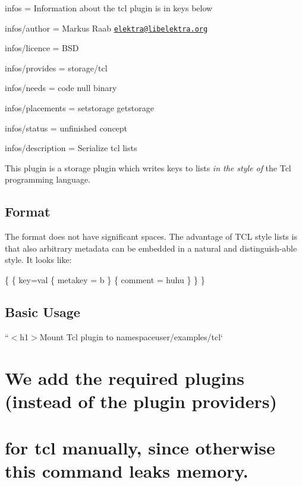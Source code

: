 
\begin{DoxyItemize}
\item infos = Information about the tcl plugin is in keys below
\item infos/author = Markus Raab \href{mailto:elektra@libelektra.org}{\tt elektra@libelektra.\+org}
\item infos/licence = B\+SD
\item infos/provides = storage/tcl
\item infos/needs = code null binary
\item infos/placements = setstorage getstorage
\item infos/status = unfinished concept
\item infos/description = Serialize tcl lists
\end{DoxyItemize}

This plugin is a storage plugin which writes keys to lists {\itshape in the style of} the Tcl programming language.

\subsection*{Format}

The format does not have significant spaces. The advantage of T\+CL style lists is that also arbitrary metadata can be embedded in a natural and distinguish-\/able style. It looks like\+:


\begin{DoxyCode}
\{
    \{
        key=val
        \{
            metakey = b
        \}
        \{
            comment = huhu
        \}
    \}
\}
\end{DoxyCode}


\subsection*{Basic Usage}

``{\ttfamily  $<$h1$>$Mount Tcl plugin to namespace}user/examples/tcl` \section*{We add the required plugins (instead of the plugin providers)}

\section*{for {\ttfamily tcl} manually, since otherwise this command leaks memory.}

